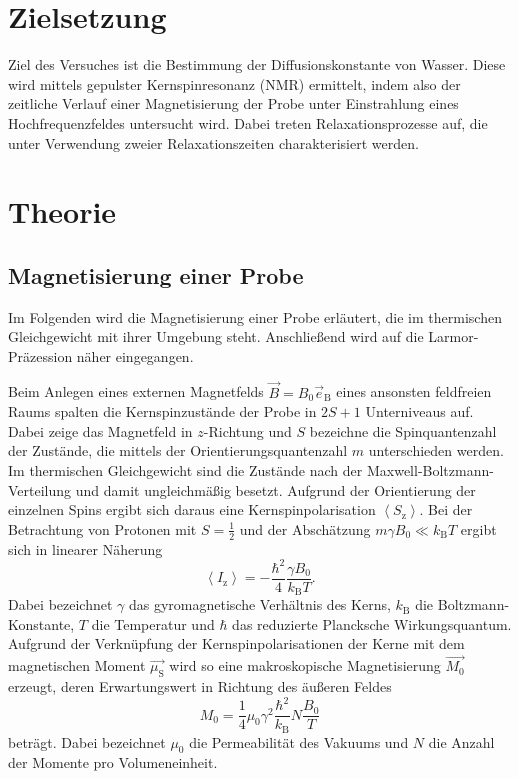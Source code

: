 \section{Zielsetzung}
\label{sec:Zielsetzung}

Ziel des Versuches ist die Bestimmung der Diffusionskonstante von Wasser.
Diese wird mittels gepulster Kernspinresonanz (NMR) ermittelt,
indem also der zeitliche Verlauf einer Magnetisierung der Probe unter
Einstrahlung eines Hochfrequenzfeldes untersucht wird.
Dabei treten Relaxationsprozesse auf, die unter Verwendung zweier
Relaxationszeiten charakterisiert werden.

\section{Theorie}
\label{sec:Theorie}

\subsection{Magnetisierung einer Probe}
\label{sec:TheoMagnetisierung}

Im Folgenden wird die Magnetisierung einer Probe erläutert, die im thermischen
Gleichgewicht mit ihrer Umgebung steht.
Anschließend wird auf die Larmor-Präzession näher eingegangen.

Beim Anlegen eines externen Magnetfelds $\vec{B} = B_0 \vec{e}_\text{B}$ eines ansonsten
feldfreien Raums spalten die Kernspinzustände der Probe in $2S+1$ Unterniveaus auf.
Dabei zeige das Magnetfeld in $z$-Richtung und $S$ bezeichne die Spinquantenzahl der
Zustände, die mittels der Orientierungsquantenzahl $m$ unterschieden werden.
Im thermischen Gleichgewicht sind die Zustände nach der Maxwell-Boltzmann-Verteilung
und damit ungleichmäßig besetzt.
Aufgrund der Orientierung der einzelnen Spins ergibt sich daraus eine Kernspinpolarisation
$\left<S_\text{z}\right>$.
Bei der Betrachtung von Protonen mit $S = \frac{1}{2}$ und der Abschätzung
$m \gamma B_0 \ll k_\text{B} T$ ergibt sich in linearer Näherung
\begin{equation*}
  \left<I_\text{z}\right> = -\frac{\hbar^2}{4}\frac{\gamma B_0}{k_\text{B} T}.
\end{equation*}
Dabei bezeichnet $\gamma$ das gyromagnetische Verhältnis des Kerns,
$k_\text{B}$ die Boltzmann-Konstante, $T$ die Temperatur
und $\hbar$ das reduzierte Plancksche Wirkungsquantum.
Aufgrund der Verknüpfung der Kernspinpolarisationen der Kerne
mit dem magnetischen Moment $\vec{\mu_\text{S}}$ wird so eine makroskopische
Magnetisierung $\vec{M_0}$ erzeugt,
deren Erwartungswert in Richtung des äußeren Feldes
\begin{equation*}
  M_0 = \frac{1}{4} \mu_0 \gamma^2 \frac{\hbar^2}{k_\text{B}} N \frac{B_0}{T}
\end{equation*}
beträgt.
Dabei bezeichnet $\mu_0$ die Permeabilität des Vakuums und
$N$ die Anzahl der Momente pro Volumeneinheit.

